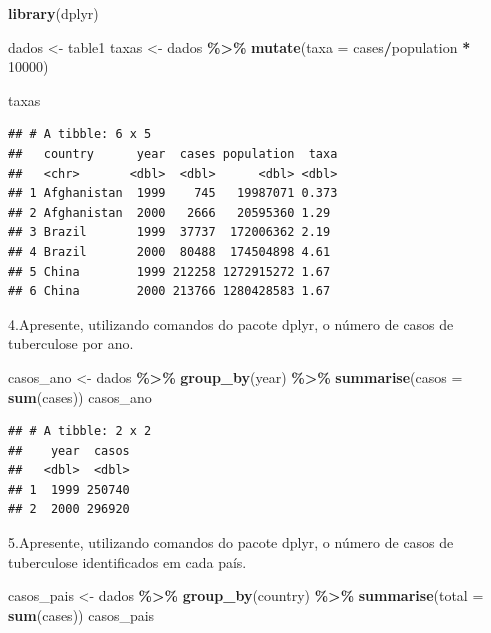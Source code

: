 \documentclass[
]{article}
\newenvironment{Shaded}{\begin{snugshade}}{\end{snugshade}}
\newcommand{\AttributeTok}[1]{\textcolor[rgb]{0.13,0.29,0.53}{#1}}
\newcommand{\DecValTok}[1]{\textcolor[rgb]{0.00,0.00,0.81}{#1}}
\newcommand{\FunctionTok}[1]{\textcolor[rgb]{0.13,0.29,0.53}{\textbf{#1}}}
\newcommand{\NormalTok}[1]{#1}
\newcommand{\OtherTok}[1]{\textcolor[rgb]{0.56,0.35,0.01}{#1}}
\newcommand{\SpecialCharTok}[1]{\textcolor[rgb]{0.81,0.36,0.00}{\textbf{#1}}}
\begin{document}
\begin{Shaded}
\begin{Highlighting}[]
\FunctionTok{library}\NormalTok{(dplyr)}

\NormalTok{dados }\OtherTok{\textless{}{-}}\NormalTok{ table1}
\NormalTok{taxas }\OtherTok{\textless{}{-}}\NormalTok{ dados }\SpecialCharTok{\%\textgreater{}\%}
        \FunctionTok{mutate}\NormalTok{(}\AttributeTok{taxa =}\NormalTok{ cases}\SpecialCharTok{/}\NormalTok{population }\SpecialCharTok{*} \DecValTok{10000}\NormalTok{)}
        
\NormalTok{taxas}
\end{Highlighting}
\end{Shaded}

\begin{verbatim}
## # A tibble: 6 x 5
##   country      year  cases population  taxa
##   <chr>       <dbl>  <dbl>      <dbl> <dbl>
## 1 Afghanistan  1999    745   19987071 0.373
## 2 Afghanistan  2000   2666   20595360 1.29 
## 3 Brazil       1999  37737  172006362 2.19 
## 4 Brazil       2000  80488  174504898 4.61 
## 5 China        1999 212258 1272915272 1.67 
## 6 China        2000 213766 1280428583 1.67
\end{verbatim}

4.Apresente, utilizando comandos do pacote dplyr, o número de casos de
tuberculose por ano.

\begin{Shaded}
\begin{Highlighting}[]
\NormalTok{casos\_ano }\OtherTok{\textless{}{-}}\NormalTok{ dados }\SpecialCharTok{\%\textgreater{}\%} 
              \FunctionTok{group\_by}\NormalTok{(year) }\SpecialCharTok{\%\textgreater{}\%} 
                \FunctionTok{summarise}\NormalTok{(}\AttributeTok{casos =} \FunctionTok{sum}\NormalTok{(cases))}
\NormalTok{casos\_ano}
\end{Highlighting}
\end{Shaded}

\begin{verbatim}
## # A tibble: 2 x 2
##    year  casos
##   <dbl>  <dbl>
## 1  1999 250740
## 2  2000 296920
\end{verbatim}

5.Apresente, utilizando comandos do pacote dplyr, o número de casos de
tuberculose identificados em cada país.

\begin{Shaded}
\begin{Highlighting}[]
\NormalTok{casos\_pais }\OtherTok{\textless{}{-}}\NormalTok{ dados }\SpecialCharTok{\%\textgreater{}\%} 
                \FunctionTok{group\_by}\NormalTok{(country) }\SpecialCharTok{\%\textgreater{}\%} 
                  \FunctionTok{summarise}\NormalTok{(}\AttributeTok{total =} \FunctionTok{sum}\NormalTok{(cases))}
\NormalTok{casos\_pais}
\end{Highlighting}
\end{Shaded}
\end{document}
